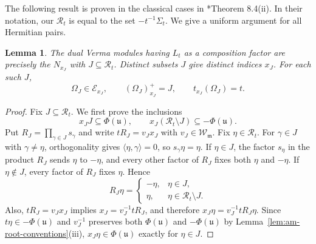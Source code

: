 \documentclass[12pt]{amsart}
\newtheorem{lemma}[theorem]{Lemma}
\theoremstyle{definition}
\numberwithin{equation}{section}
\newcommand{\m}{\mathfrak m}
\newcommand{\W}{\mathscr W}
\begin{document}
The following result is proven in the classical cases in 
\cite{EnrightShelton}*{Theorem 8.4(ii)}. In their notation, our $\mathscr{R}_t$ is equal to the set $-t^{-1}\Sigma_t$. We give a uniform argument for all Hermitian pairs.

\begin{lemma}\label{lem:am-column}
The dual Verma modules having $L_t$ as a composition factor
are precisely the $N_{x_J}$ with $J\subseteq\mathscr{R}_t$.
Distinct subsets $J$ give distinct indices $x_J$. For each such $J$,
\begin{equation}\label{eq:J}
 \Omega_J\in\mathscr E_{x_J},\qquad
 (\Omega_J)^+_{x_J}=J,\qquad
 t_{x_J}(\Omega_J)=t.
\end{equation}
\end{lemma}
\begin{proof}
Fix $J\subseteq\mathscr{R}_t$. We first prove the inclusions
\begin{equation}\label{eq:am-column-signs}
 x_JJ\subseteq\Phi(\mathfrak{u}),\qquad
 x_J(\mathscr{R}_t\setminus J)\subseteq-\Phi(\mathfrak{u}).
\end{equation}
Put $R_J=\prod_{\gamma\in J}s_\gamma$ and write
$tR_J=v_Jx_J$ with $v_J\in\W_{\m}$.
Fix $\eta\in\mathscr{R}_t$. For $\gamma\in J$ with $\gamma\ne\eta$,
orthogonality gives $\langle\eta,\gamma\rangle=0$, so
$s_\gamma\eta=\eta$.
If $\eta\in J$, the factor $s_\eta$ in the product $R_J$ sends
$\eta$ to $-\eta$, and every other factor of $R_J$ fixes both
$\eta$ and $-\eta$.
If $\eta\notin J$, every factor of $R_J$ fixes $\eta$. Hence
\[
 R_J\eta=\begin{cases}-\eta,&\eta\in J,\\\eta,&\eta\in\mathscr{R}_t\setminus J.\end{cases}
\]
Also, $tR_J=v_Jx_J$ implies $x_J=v_J^{-1}tR_J$, and therefore
$x_J\eta=v_J^{-1}tR_J\eta$.
Since $t\eta\in-\Phi(\mathfrak{u})$ and $v_J^{-1}$ preserves both
$\Phi(\mathfrak{u})$ and $-\Phi(\mathfrak{u})$ by Lemma~\ref{lem:am-root-conventions}\textup{(iii)},
$x_J\eta\in\Phi(\mathfrak{u})$ exactly for $\eta\in J$.


\end{proof}
\end{document}
